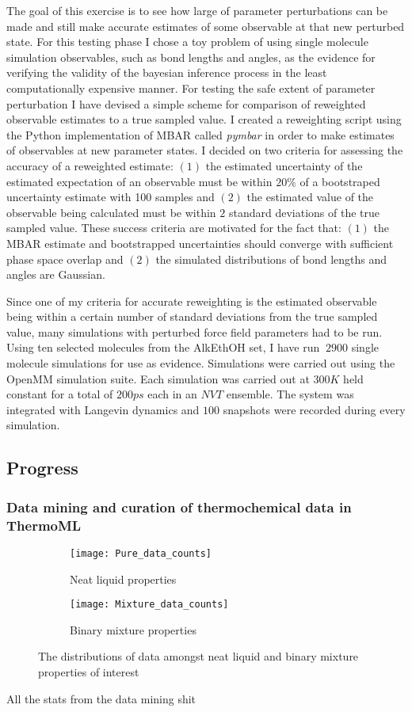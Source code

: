 \documentclass[rmp,nofootinbib,superscriptaddress,12pt,tightenlines,notitlepage]{revtex4-1}
\begin{document}
The goal of this exercise is to see how large of parameter perturbations can be made and still make accurate estimates of some observable at that new perturbed state. For this testing phase I chose a toy problem of using single molecule simulation observables, such as bond lengths and angles, as the evidence for verifying the validity of the bayesian inference process in the least computationally expensive manner. For testing the safe extent of parameter perturbation I have devised a simple scheme for comparison of reweighted observable estimates to a true sampled value. I created a reweighting script using the Python implementation
of MBAR called \textit{pymbar} in order to make estimates of observables at new parameter states. I decided on two criteria for assessing the accuracy
of a reweighted estimate: $\left(1\right)$ the estimated uncertainty of the estimated expectation of an observable must be within $20 \%$ of a bootstraped uncertainty estimate with 100 samples and $\left(2\right)$ the estimated value of the observable being calculated must be within $2$ standard deviations of the true
sampled value. These success criteria are motivated for the fact that: $\left(1\right)$ the MBAR estimate and bootstrapped uncertainties should converge with 
sufficient phase space overlap and $\left(2\right)$ the simulated distributions of bond lengths and angles are Gaussian. 

Since one of my criteria for accurate reweighting is the estimated observable being within a certain number of standard deviations from the true sampled value, many simulations with perturbed force field parameters had to be run. Using ten selected molecules from the AlkEthOH set, I have run $~2900$
single molecule simulations for use as evidence. Simulations were carried out using the OpenMM simulation suite. Each simulation was carried out at 
$300 K$ held constant for a total of $200 ps$ each in an $NVT$ ensemble. The system was integrated with Langevin dynamics and $100$ snapshots were recorded 
during every simulation.

\subsection{Progress}
\subsubsection{Data mining and curation of thermochemical data in ThermoML}
\begin{figure}[h!]
\centering
\begin{subfigure}{.5\textwidth}
  \centering
  \texttt{[image: Pure\_data\_counts]}
  \caption{Neat liquid properties}
  \label{fig:sub1}
\end{subfigure}%
\begin{subfigure}{.5\textwidth}
  \centering
  \texttt{[image: Mixture\_data\_counts]}
  \caption{Binary mixture properties}
  \label{fig:sub2}
\end{subfigure}
\caption{The distributions of data amongst neat liquid and binary mixture properties of interest}
\label{fig:test}
\end{figure}
All the stats from the data mining shit
\end{document}
